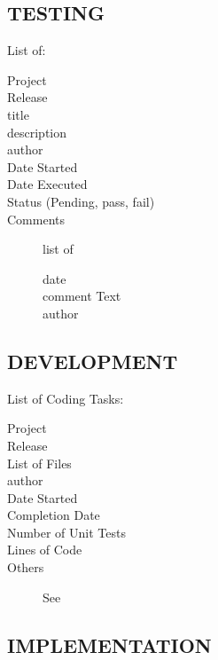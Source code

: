 \documentclass[SDSUThesis.tex]{subfiles}
\begin{document}
    
    
    \subsection{TESTING}
    
    List of:
    \begin{description}
      \item[Project] 
      \item[Release]
      \item[title]
      \item[description]
      \item[author]
      \item[Date Started]
      \item[Date Executed]
      \item[Status (Pending, pass, fail)]
      \item[Comments] list of \\
      \begin{description}
        \item[date]
        \item[comment Text]
        \item[author]
      \end{description}
    \end{description}
    
    \subsection{DEVELOPMENT}
    
    List of Coding Tasks:
    \begin{description}
      \item[Project] 
      \item[Release]
      \item[List of Files]
      \item[author]
      \item[Date Started]
      \item[Completion Date]
      \item[Number of Unit Tests]
      \item[Lines of Code]
      \item[Others] See \cite{Jones2009, Jones2012, Rubin2007, Snipes2013}
    \end{description}
    
    \subsection{IMPLEMENTATION}
    
\end{document}
